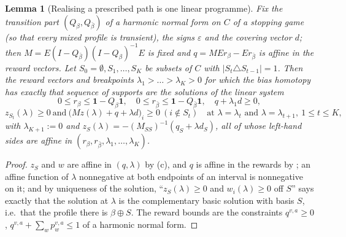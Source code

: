 \documentclass[11pt]{article}
\theoremstyle{plain}
\newtheorem{lemma}[theorem]{Lemma}
\theoremstyle{definition}
\newcommand{\bbone}{\mathbf{1}}
\begin{document}
\begin{lemma}[Realising a prescribed path is one linear programme]\label{lem:bias-path-lp}
Fix the transition part $(Q_\beta,Q_{\bar\beta})$ of a harmonic normal form on
$C$ of a \emph{stopping} game (so that every mixed profile is transient),
the signs $\varepsilon$ and the covering vector $d$; then
$M=E(I-Q_{\bar\beta})(I-Q_\beta)^{-1}E$ is fixed and
$q=MEr_\beta-Er_{\bar\beta}$ is affine in the reward vectors. Let
$S_0=\emptyset,S_1,\dots,S_K$ be subsets of $C$ with
$|S_t\triangle S_{t-1}|=1$. Then the reward vectors and breakpoints
$\lambda_1>\dots>\lambda_K>0$ for which the bias homotopy has exactly that
sequence of supports are the solutions of the linear system
\[
  0\le r_{\beta}\le\bbone-Q_\beta\bbone,\quad
  0\le r_{\bar\beta}\le\bbone-Q_{\bar\beta}\bbone,\quad
  q+\lambda_1d\ge0,
\]
\[
  z_{S_t}(\lambda)\ge0\ \text{and}\ \bigl(Mz(\lambda)+q+\lambda d\bigr)_i\ge0\ (i\notin S_t)
  \quad\text{at }\lambda=\lambda_t\text{ and }\lambda=\lambda_{t+1},\ 1\le t\le K,
\]
with $\lambda_{K+1}:=0$ and $z_{S}(\lambda)=-(M_{SS})^{-1}(q_S+\lambda d_S)$,
all of whose left-hand sides are affine in
$(r_\beta,r_{\bar\beta},\lambda_1,\dots,\lambda_K)$.
\end{lemma}

\begin{proof}
$z_S$ and $w$ are affine in $(q,\lambda)$ by
(c), and $q$ is affine in the rewards by
; an affine function of $\lambda$ nonnegative at both
endpoints of an interval is nonnegative on it; and by uniqueness of the
solution, ``$z_{S}(\lambda)\ge0$ and $w_i(\lambda)\ge0$ off $S$'' says exactly
that the solution at $\lambda$ is the complementary basic solution with basis
$S$, i.e.\ that the profile there is $\beta\oplus S$. The reward bounds are
the constraints $q^{v,a}\ge0$, $q^{v,a}+\sum_wp^{v,a}_w\le1$ of a harmonic
normal form.
\end{proof}
\end{document}
